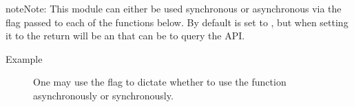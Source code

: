 \documentclass[letterpaper,10pt,english,openany,oneside]{sphinxmanual}
\begin{document}
\begin{sphinxadmonition}{note}{Note:}
This module can either be used synchronous or asynchronous via the  flag passed to each
of the functions below. By default  is set to , but when setting it to 
the return will be an  that can be  to query the API.
\begin{description}
\item[{Example}] \leavevmode
One may use the  flag to dictate whether to use the function asynchronously
or synchronously.

\begin{sphinxVerbatim}[commandchars=\\\{\}]
   

 

      
      
      

  


\end{sphinxVerbatim}
\end{description}
\end{sphinxadmonition}
\end{document}
